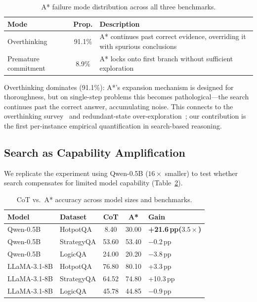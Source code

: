 \documentclass{article}
\newcommand{\pp}{\,pp\xspace}
\begin{document}
\begin{table}[t]
\centering
\caption{A* failure mode distribution across all three benchmarks.}
\label{tab:failure}
\small
\begin{tabular}{@{}lcp{7.5cm}@{}}
\toprule
\textbf{Mode} & \textbf{Prop.} & \textbf{Description} \\
\midrule
Overthinking         & 91.1\% & A* continues past correct evidence, overriding
  it with spurious conclusions \\
Premature commitment &  8.9\% & A* locks onto first branch without sufficient
  exploration \\
\bottomrule
\end{tabular}
\end{table}

Overthinking dominates (91.1\%): A*'s expansion mechanism is designed for
thoroughness, but on single-step problems this becomes pathological---the
search continues past the correct answer, accumulating noise.  This connects
to the overthinking survey~\citep{zhang2025survey} and redundant-state
over-exploration~\citep{zhang2025streamlined}; our contribution is the first
per-instance empirical quantification in search-based reasoning.

\subsection{Search as Capability Amplification}
\label{sec:slm}

We replicate the experiment using Qwen-0.5B ($16\times$ smaller) to test
whether search compensates for limited model capability
(Table~\ref{tab:slm}).

\begin{table}[t]
\centering
\caption{CoT vs.\ A* accuracy across model sizes and benchmarks.}
\label{tab:slm}
\small
\begin{tabular}{@{}llccl@{}}
\toprule
\textbf{Model} & \textbf{Dataset} & \textbf{CoT} & \textbf{A*} & \textbf{Gain} \\
\midrule
Qwen-0.5B      & HotpotQA   &  8.40 & 30.00 & \textbf{+21.6\pp ($3.5\times$)} \\
Qwen-0.5B      & StrategyQA & 53.60 & 53.40 & $-$0.2\pp \\
Qwen-0.5B      & LogicQA    & 24.00 & 20.20 & $-$3.8\pp \\
\midrule
LLaMA-3.1-8B   & HotpotQA   & 76.80 & 80.10 & +3.3\pp \\
LLaMA-3.1-8B   & StrategyQA & 64.52 & 74.80 & +10.3\pp \\
LLaMA-3.1-8B   & LogicQA    & 45.78 & 44.85 & $-$0.9\pp \\
\bottomrule
\end{tabular}
\end{table}
\end{document}
